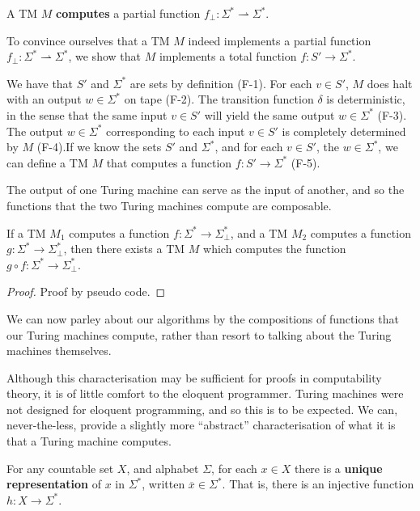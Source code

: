 \begin{definition} A TM $M$ \textbf{computes} a partial function $f_\bot :
\Sigma^* \rightharpoonup \Sigma^*$. \end{definition}

To convince ourselves that a TM $M$ indeed implements a partial function
$f_\bot : \Sigma^* \rightharpoonup \Sigma^*$, we show that $M$ implements a
total function $f:S'\rightarrow \Sigma^*$.

We have that $S'$ and $\Sigma^*$ are sets by definition (F-1). For each $v\in
S'$, $M$ does halt with an output $w\in\Sigma^*$ on tape (F-2). The transition
function $\delta$ is deterministic, in the sense that the same input $v\in S'$
will yield the same output $w\in\Sigma^*$ (F-3). The output $w\in\Sigma^*$
corresponding to each input $v\in S'$ is completely determined by $M$ (F-4).If
we know the sets $S'$ and $\Sigma^*$, and for each $v\in S'$, the $w\in
\Sigma^*$, we can define a TM $M$ that computes a function $f:S'\rightarrow
\Sigma^*$ (F-5).

The output of one Turing machine can serve as the input of another, and so the
functions that the two Turing machines compute are composable.

\begin{theorem} If a TM $M_1$ computes a function $f : \Sigma^* \rightarrow
\Sigma^*_\bot$, and a TM $M_2$ computes a function $g : \Sigma^* \rightarrow
\Sigma^*_\bot$, then there exists a TM $M$ which computes the function $g\circ
f : \Sigma^* \rightarrow \Sigma^*_\bot$.\end{theorem}

\begin{proof} Proof by pseudo code. \end{proof}

We can now parley about our algorithms by the compositions of functions that
our Turing machines compute, rather than resort to talking about the Turing
machines themselves.

Although this characterisation may be sufficient for proofs in computability
theory, it is of little comfort to the eloquent programmer. Turing machines
were not designed for eloquent programming, and so this is to be expected.  We
can, never-the-less, provide a slightly more ``abstract'' characterisation of
what it is that a Turing machine computes.


\begin{theorem}\label{thm:unique-representation} For any countable set $X$, and
alphabet $\Sigma$, for each $x\in X$ there is a \textbf{unique representation}
of $x$ in $\Sigma^*$, written $\overline{x}\in\Sigma^*$. That is, there is an
injective function $h:X\rightarrow \Sigma^*$. \end{theorem}

